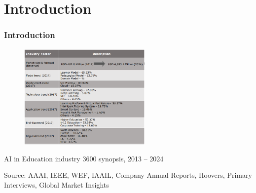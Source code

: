 \documentclass{beamer}
\begin{document}
\section{Introduction} %
\begin{frame}
\frametitle{Introduction}

\begin{center}
	

		\begin{figure}
			\includegraphics[width=65mm]{market2.png}
				
			
		\end{figure}
{\footnotesize 	AI in Education industry 3600 synopsis, 2013 – 2024}
	
{\tiny Source: AAAI, IEEE, WEF, IAAIL, Company Annual Reports, Hoovers, Primary Interviews, Global Market Insights}
\end{center}




\end{frame}
\end{document}
